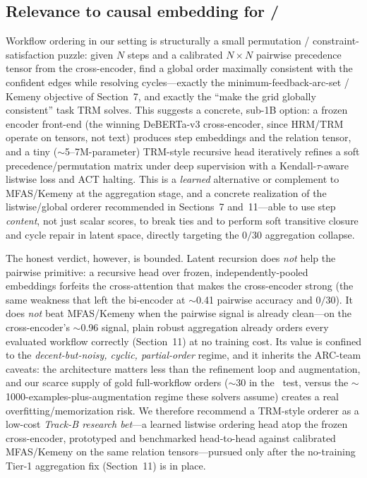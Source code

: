 \subsection{Relevance to causal embedding for \aep/\ajo}
Workflow ordering in our setting is structurally a small permutation / constraint-satisfaction
puzzle: given $N$ steps and a calibrated $N{\times}N$ pairwise precedence tensor from the
cross-encoder, find a global order maximally consistent with the confident edges while
resolving cycles---exactly the minimum-feedback-arc-set / Kemeny objective of Section~7, and
exactly the ``make the grid globally consistent'' task TRM solves. This suggests a concrete,
sub-1B option: a frozen encoder front-end (the winning DeBERTa-v3 cross-encoder, since
HRM/TRM operate on tensors, not text) produces step embeddings and the relation tensor, and a
tiny ($\sim$5--7M-parameter) TRM-style recursive head iteratively refines a soft
precedence/permutation matrix under deep supervision with a Kendall-$\tau$-aware listwise
loss and ACT halting. This is a \emph{learned} alternative or complement to MFAS/Kemeny at the
aggregation stage, and a concrete realization of the listwise/global orderer recommended in
Sections~7 and~11---able to use step \emph{content}, not just scalar scores, to break ties and
to perform soft transitive closure and cycle repair in latent space, directly targeting the
$0/30$ aggregation collapse.

The honest verdict, however, is bounded. Latent recursion does \emph{not} help the pairwise
primitive: a recursive head over frozen, independently-pooled embeddings forfeits the
cross-attention that makes the cross-encoder strong (the same weakness that left the
bi-encoder at $\sim$0.41 pairwise accuracy and $0/30$). It does \emph{not} beat MFAS/Kemeny
when the pairwise signal is already clean---on the cross-encoder's $\sim$0.96 signal, plain
robust aggregation already orders every evaluated workflow correctly (Section~11) at no
training cost. Its value is confined to the \emph{decent-but-noisy, cyclic, partial-order}
regime, and it inherits the ARC-team caveats: the architecture matters less than the
refinement loop and augmentation, and our scarce supply of gold full-workflow orders ($\sim$30
in the \ajo\ test, versus the $\sim$1000-examples-plus-augmentation regime these solvers
assume) creates a real overfitting/memorization risk. We therefore recommend a TRM-style
orderer as a low-cost \emph{Track-B research bet}---a learned listwise ordering head atop the
frozen cross-encoder, prototyped and benchmarked head-to-head against calibrated MFAS/Kemeny
on the same relation tensors---pursued only after the no-training Tier-1 aggregation fix
(Section~11) is in place.
